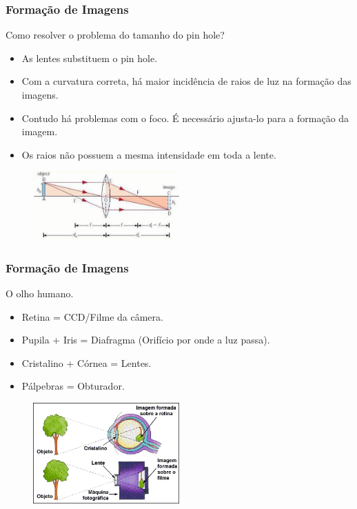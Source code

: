 \documentclass{beamer}
\begin{document}
\begin{frame}
\frametitle{Formação de Imagens}

	\begin{block}{Como resolver o problema do tamanho do pin hole?}
		\begin{itemize}
			\item As lentes substituem o pin hole.
			\item Com a curvatura correta, há maior incidência de raios de luz na formação das imagens.
			\item Contudo há problemas com o foco. É necessário ajusta-lo para a formação da imagem.
			\item Os raios não possuem a mesma intensidade em toda a lente.
		\end{itemize}
	\end{block}
	
	\begin{figure}[htb!]
  		\centering
      		\includegraphics[width=0.5\textwidth]{Figures/lente}
  		\label{iep}
	\end{figure}

\end{frame}

\begin{frame}
\frametitle{Formação de Imagens}

	\begin{block}{O olho humano.}
		\begin{itemize}
			\item Retina = CCD/Filme da câmera.
			\item Pupila + Iris = Diafragma (Orifício por onde a luz passa).
			\item Cristalino + Córnea = Lentes.
			\item Pálpebras = Obturador.
		\end{itemize}
	\end{block}
	
	\begin{figure}[htb!]
  		\centering
      		\includegraphics[width=0.5\textwidth]{Figures/olho_humano}
  		\label{iep}
	\end{figure}

\end{frame}
\end{document}
